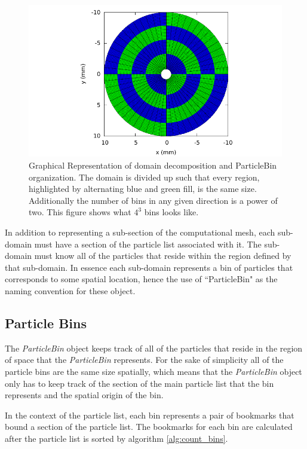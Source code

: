 \begin{figure}
\begin{center}
\includegraphics[width=5in]{implementation/zorder_sceptic.pdf}
\end{center}
\caption[ParticleBin Organization]{Graphical Representation of domain decomposition and ParticleBin organization. The domain is divided up such that every region, highlighted by alternating blue and green fill, is the same size. Additionally the number of bins in any given direction is a power of two. This figure shows what $4^3$ bins looks like.}
\label{fig:domain_decomp}
\end{figure}

In addition to representing a sub-section of the computational mesh, each sub-domain must have a section of the particle list associated with it. The sub-domain must know all of the particles that reside within the region defined by that sub-domain. In essence each sub-domain represents a bin of particles that corresponds to some spatial location, hence the use of ``ParticleBin"  as the naming convention for these object.



	\subsection{Particle Bins}
The \emph{ParticleBin} object keeps track of all of the particles that reside in the region of space that the \emph{ParticleBin} represents. For the sake of simplicity all of the particle bins are the same size spatially, which means that the \emph{ParticleBin} object only has to keep track of the section of the main particle list that the bin represents and the spatial origin of the bin. 

In the context of the particle list, each bin represents a pair of bookmarks that bound a section of the particle list. The bookmarks for each bin are calculated after the particle list is sorted by algorithm \ref{alg:count_bins}.

